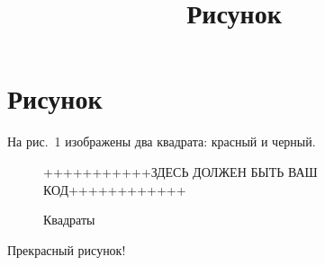 \documentclass[a4paper,12pt]{article}
\title{Рисунок}
\begin{document}
\section*{Рисунок}

На рис.~1 изображены два квадрата: красный и черный.

\begin{figure}
\centering
\++++++++++++ЗДЕСЬ ДОЛЖЕН БЫТЬ ВАШ КОД++++++++++++
\caption{Квадраты}\label{squares}
\end{figure}

Прекрасный рисунок!
\end{document}
